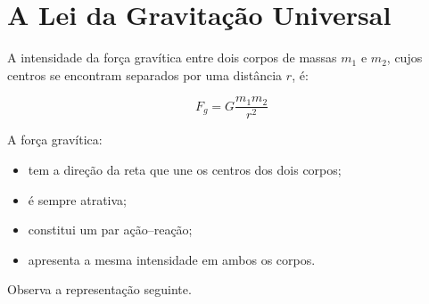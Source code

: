 \documentclass[11pt,a4paper]{article}
\begin{document}
	\section{A Lei da Gravitação Universal}
	
	\begin{recorda}
		
		A intensidade da força gravítica entre dois corpos de massas $m_1$ e
		$m_2$, cujos centros se encontram separados por uma distância $r$, é:
		
		\[
		\boxed{
			F_g=
			G\frac{m_1m_2}{r^2}
		}
		\]
		
		A força gravítica:
		
		\begin{itemize}
			
			\item tem a direção da reta que une os centros dos dois corpos;
			
			\item é sempre atrativa;
			
			\item constitui um par ação--reação;
			
			\item apresenta a mesma intensidade em ambos os corpos.
			
		\end{itemize}
		
	\end{recorda}
	
	Observa a representação seguinte.
	
\end{document}
